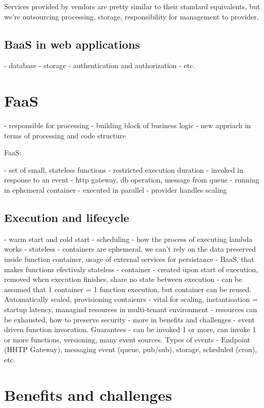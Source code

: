 Services provided by vendors are pretty similar to their standard equivalents, but we're outsourcing processing, storage, responsibility for management to provider.

\subsection*{BaaS in web applications}

- database
- storage
- authentication and authorization
- etc.

\section*{FaaS}

- responsible for processing - building block of business logic
- new appriach in terms of processing and code structure

FaaS:

- set of small, stateless functions
- restricted execution duration
- invoked in response to an event - http gateway, db operation, message from queue
- running in ephemeral container
- executed in parallel - provider handles scaling

\subsection*{Execution and lifecycle}

- warm start and cold start
- scheduling
- how the process of executing lambda works
- stateless - containers are ephemeral, we can't rely on the data preserved inside function container, usage of external services for persistance - BaaS, that makes functions efectivaly stateless
- container - created upon start of execution, removed when execution finishes, share no state between execution - can be assumed that 1 container = 1 function execution, but container can be reused. Automatically scaled, provisioning contaienrs - vital for scaling, instantioation = startup latency, managind resources in multi-tenant environment - resources can be exhausted, how to preserve security - more in benefits and challenges
- event driven function invocation. Guarantees - can be invoked 1 or more, can invoke 1 or more functions, versioning, many event sources. Types of events - Endpoint (HHTP Gateway), messaging event (queue, pub/sub), storage, scheduled (cron), etc.

\section*{Benefits and challenges}

